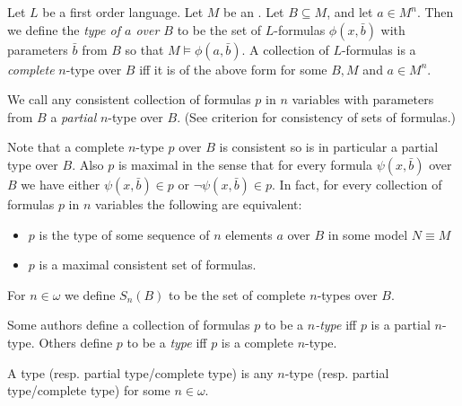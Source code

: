 \documentclass[12pt]{article}
\begin{document}
Let $L$ be a first order language.
Let $M$ be an .
Let $B \subseteq M$, and let $a \in M^{n}$.
Then we define the {\em type of $a$ over $B$} to be the set of $L$-formulas $\phi(x,\bar{b})$ with parameters $\bar{b}$ from $B$ so that $M \models \phi(a,\bar{b})$.
A collection of $L$-formulas is a {\em complete} $n$-type over $B$ iff it is of the above form for some $B,M$ and $a \in M^{n}$.

\medskip

We call any consistent collection of formulas $p$ in $n$ variables with parameters from $B$ a {\em partial} $n$-type over $B$. (See criterion for consistency of sets of formulas.)

\medskip

Note that a complete $n$-type $p$ over $B$ is consistent so is in particular a partial type over $B$. Also $p$ is maximal in the sense that for every formula $\psi(x,\bar{b})$ over $B$ we have either $\psi(x,\bar{b}) \in p$ or $\lnot \psi(x,\bar{b}) \in p$. 
In fact, for every collection of formulas $p$ in $n$ variables the following are equivalent:
 
\begin{itemize} \item $p$ is the type of some sequence of $n$ elements $a$ over $B$ in some model $N \equiv M$
\item  $p$ is a maximal consistent set of formulas.\end{itemize}

For $n \in \omega$ we define $S_{n}(B)$ to be the set of complete $n$-types over $B$.

\medskip

Some authors define a collection of formulas $p$ to be a {\em $n$-type} iff $p$ is a partial $n$-type. Others define $p$ to be a {\em type} iff $p$ is a complete $n$-type.

\medskip

A type (resp. partial type/complete type) is any $n$-type (resp. partial type/complete type) for some $n \in \omega$.
\end{document}
